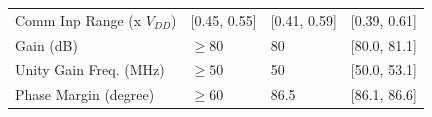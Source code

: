 \documentclass[
]{article}
\begin{document}
\begin{longtable}[]{@{}llll@{}}
\begin{minipage}[t]{0.40\columnwidth}
Comm Inp Range (x \(V_{DD}\))\strut
\end{minipage} & \begin{minipage}[t]{0.16\columnwidth}\raggedright
{[}0.45, 0.55{]}\strut
\end{minipage} & \begin{minipage}[t]{0.16\columnwidth}\raggedright
{[}0.41, 0.59{]}\strut
\end{minipage} & \begin{minipage}[t]{0.16\columnwidth}\raggedright
{[}0.39, 0.61{]}\strut
\end{minipage}\tabularnewline
\begin{minipage}[t]{0.40\columnwidth}\raggedright
Gain (dB)\strut
\end{minipage} & \begin{minipage}[t]{0.16\columnwidth}\raggedright
\(\geq 80\)\strut
\end{minipage} & \begin{minipage}[t]{0.16\columnwidth}\raggedright
80\strut
\end{minipage} & \begin{minipage}[t]{0.16\columnwidth}\raggedright
{[}80.0, 81.1{]}\strut
\end{minipage}\tabularnewline
\begin{minipage}[t]{0.40\columnwidth}\raggedright
Unity Gain Freq. (MHz)\strut
\end{minipage} & \begin{minipage}[t]{0.16\columnwidth}\raggedright
\(\geq 50\)\strut
\end{minipage} & \begin{minipage}[t]{0.16\columnwidth}\raggedright
50\strut
\end{minipage} & \begin{minipage}[t]{0.16\columnwidth}\raggedright
{[}50.0, 53.1{]}\strut
\end{minipage}\tabularnewline
\begin{minipage}[t]{0.40\columnwidth}\raggedright
Phase Margin (degree)\strut
\end{minipage} & \begin{minipage}[t]{0.16\columnwidth}\raggedright
\(\geq 60\)\strut
\end{minipage} & \begin{minipage}[t]{0.16\columnwidth}\raggedright
86.5\strut
\end{minipage} & \begin{minipage}[t]{0.16\columnwidth}\raggedright
{[}86.1, 86.6{]}\strut
\end{minipage}\tabularnewline

\end{longtable}
\end{document}

